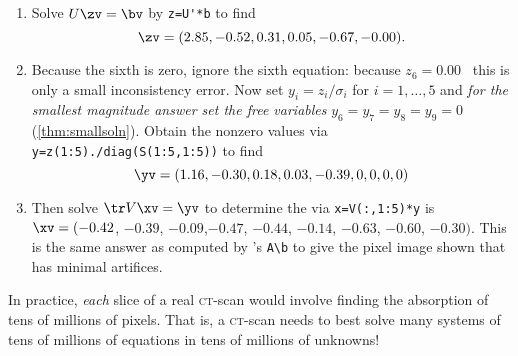 \begin{example}
\begin{enumerate}
\item Solve \(U\zv=\bv\) by \verb|z=U'*b| to find
\begin{equation*}
\zv=(2.85,-0.52, 0.31, 0.05,-0.67,-0.00).
\end{equation*}

\item Because the sixth  is zero, ignore the sixth equation: because \(z_6=0.00\) \twodp\ this is only a small inconsistency error.
Now set $y_i=z_i/\sigma_i$ for \(i=1,\ldots,5\) and \emph{for the smallest magnitude answer set the free variables} \(y_6=y_7=y_8=y_9=0\) (\cref{thm:smallsoln}).
Obtain the nonzero values via \verb|y=z(1:5)./diag(S(1:5,1:5))| to find
\begin{equation*}
\yv=(1.16,-0.30, 0.18, 0.03,-0.39,0,0,0,0)
\end{equation*}

\item Then solve \(\tr V\xv=\yv\) to determine the  via \verb|x=V(:,1:5)*y| is
\(\xv= (-0.42\), \(-0.39\), \(-0.09\),\( -0.47\), \(-0.44\), \(-0.14\), \(-0.63\), \(-0.60\), \(-0.30)\).
%
This is the same answer as computed by \script[2]'s \verb|A\b| to give the pixel image shown that has minimal artifices.
\end{enumerate}
In practice, \emph{each} slice of a real \textsc{ct}-scan would involve finding the absorption of tens of millions of pixels.
That is, a \textsc{ct}-scan needs to best solve many systems of tens of millions of equations in tens of millions of unknowns!
\end{example}



